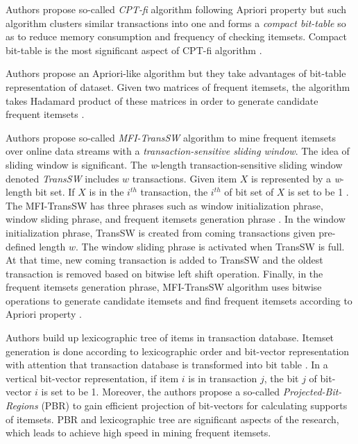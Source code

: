 \documentclass{article}
\begin{document}
Authors \cite{raja:bittablefi} propose so-called \textit{CPT-fi} algorithm following Apriori property but such algorithm clusters similar transactions into one and forms a \textit{compact bit-table} so as to reduce memory consumption and frequency of checking itemsets. Compact bit-table is the most significant aspect of CPT-fi algorithm \cite[p.~74]{raja:bittablefi}.

Authors \cite{kiraly:bittable} propose an Apriori-like algorithm but they take advantages of bit-table representation of dataset. Given two matrices of frequent itemsets, the algorithm takes Hadamard product of these matrices in order to generate candidate frequent itemsets \cite[p.~4]{kiraly:bittable}.

Authors \cite{li:slidingwindow} propose so-called \textit{MFI-TransSW} algorithm to mine frequent itemsets over online data streams with a \textit{transaction-sensitive sliding window}. The idea of sliding window is significant. The \textit{w}-length transaction-sensitive sliding window denoted \textit{TransSW} includes $w$ transactions. Given item $X$ is represented by a \textit{w}-length bit set. If $X$ is in the $i^{th}$ transaction, the $i^{th}$ of bit set of $X$ is set to be 1 \cite[p.~2674]{li:slidingwindow}. The MFI-TransSW has three phrases such as window initialization phrase, window sliding phrase, and frequent itemsets generation phrase \cite[p.~2674]{li:slidingwindow}. In the window initialization phrase, TransSW is created from coming transactions given pre-defined length $w$. The window sliding phrase is activated when TransSW is full. At that time, new coming transaction is added to TransSW and the oldest transaction is removed based on bitwise left shift operation. Finally, in the frequent itemsets generation phrase, MFI-TransSW algorithm uses bitwise operations to generate candidate itemsets and find frequent itemsets according to Apriori property \cite[p.~2675]{li:slidingwindow}.

Authors \cite{bashir:fast} build up lexicographic tree of items in transaction database. Itemset generation is done according to lexicographic order and bit-vector representation with attention that transaction database is transformed into bit table \cite[p.~8]{bashir:fast}. In a vertical bit-vector representation, if item $i$ is in transaction $j$, the bit $j$ of bit-vector $i$ is set to be 1. Moreover, the authors \cite[pp.~9-10]{bashir:fast} propose a so-called \textit{Projected-Bit-Regions} (PBR) to gain efficient projection of bit-vectors for calculating supports of itemsets. PBR and lexicographic tree are significant aspects of the research, which leads to achieve high speed in mining frequent itemsets.
\end{document}
